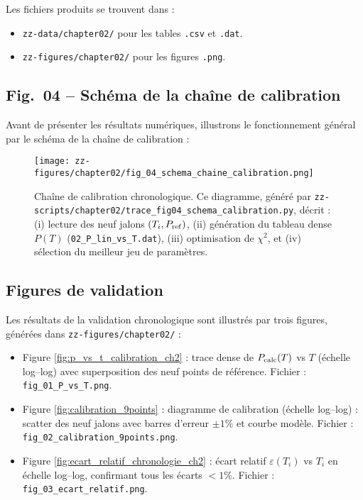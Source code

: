 Les fichiers produits se trouvent dans :
\begin{itemize}
  \item \texttt{zz-data/chapter02/} pour les tables \texttt{.csv} et \texttt{.dat}.
  \item \texttt{zz-figures/chapter02/} pour les figures \texttt{.png}.
\end{itemize}

\subsection{Fig.~04 – Schéma de la chaîne de calibration}

Avant de présenter les résultats numériques, illustrons le fonctionnement général par le schéma de la chaîne de calibration :

\begin{figure}[htbp]
  \centering
  \texttt{[image: zz-figures/chapter02/fig\_04\_schema\_chaine\_calibration.png]}
  \caption{Chaîne de calibration chronologique. Ce diagramme, généré par \texttt{zz-scripts/chapter02/trace\_fig04\_schema\_calibration.py}, décrit :
    (i) lecture des neuf jalons \((T_i,P_{\rm ref})\),
    (ii) génération du tableau dense \(P(T)\) (\texttt{02\_P\_lin\_vs\_T.dat}),
    (iii) optimisation de \(\chi^2\), et
    (iv) sélection du meilleur jeu de paramètres.}
  \label{fig:schema_chaine_calibration}
\end{figure}

\subsection{Figures de validation}

Les résultats de la validation chronologique sont illustrés par trois figures, générées dans \texttt{zz-figures/chapter02/} :

\begin{itemize}
  \item Figure \ref{fig:p_vs_t_calibration_ch2} :
    trace dense de \(P_{\rm calc}(T)\) vs \(T\) (échelle log–log) avec superposition des neuf points de référence.
    Fichier : \texttt{fig\_01\_P\_vs\_T.png}.

  \item Figure \ref{fig:calibration_9points} :
    diagramme de calibration (échelle log–log) : scatter des neuf jalons avec barres d’erreur \(\pm1\%\) et courbe modèle.
    Fichier : \texttt{fig\_02\_calibration\_9points.png}.

  \item Figure \ref{fig:ecart_relatif_chronologie_ch2} :
    écart relatif \(\varepsilon(T_i)\) vs \(T_i\) en échelle log–log, confirmant tous les écarts \(<1\%\).
    Fichier : \texttt{fig\_03\_ecart\_relatif.png}.
\end{itemize}

